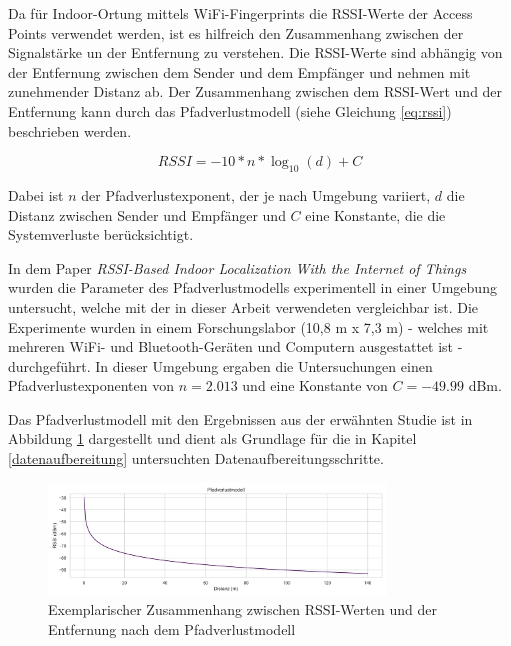 Da für Indoor-Ortung mittels WiFi-Fingerprints die RSSI-Werte der Access Points verwendet werden, ist es hilfreich den Zusammenhang zwischen der Signalstärke un der Entfernung zu verstehen. Die RSSI-Werte sind abhängig von der Entfernung zwischen dem Sender und dem Empfänger und nehmen mit zunehmender Distanz ab. Der Zusammenhang zwischen dem RSSI-Wert und der Entfernung kann durch das Pfadverlustmodell (siehe Gleichung \ref{eq:rssi}) beschrieben werden.

\begin{equation}
    RSSI = -10 * n * \log_{10}(d) + C
    \label{eq:rssi}
\end{equation}

Dabei ist \(n\) der Pfadverlustexponent, der je nach Umgebung variiert, \(d\) die Distanz zwischen Sender und Empfänger und \(C\) eine Konstante, die die Systemverluste berücksichtigt.

In dem Paper \textit{RSSI-Based Indoor Localization With the Internet of Things} wurden die Parameter des Pfadverlustmodells experimentell in einer Umgebung untersucht, welche mit der in dieser Arbeit verwendeten vergleichbar ist. Die Experimente wurden in einem Forschungslabor (10,8 m x 7,3 m) - welches mit mehreren WiFi- und Bluetooth-Geräten und Computern ausgestattet ist - durchgeführt. In dieser Umgebung ergaben die Untersuchungen einen Pfadverlustexponenten von \(n = 2.013\) und eine Konstante von \(C = -49.99\) dBm.

Das Pfadverlustmodell mit den Ergebnissen aus der erwähnten Studie ist in Abbildung \ref{fig:plot_rssi_distance} dargestellt und dient als Grundlage für die in Kapitel \ref{datenaufbereitung} untersuchten Datenaufbereitungsschritte.

\begin{figure}[H]
    \centering
    \includegraphics[width=0.8\textwidth]{images/plot_rssi_distance.png}
    \caption{Exemplarischer Zusammenhang zwischen RSSI-Werten und der Entfernung nach dem Pfadverlustmodell}
    \label{fig:plot_rssi_distance}
\end{figure}